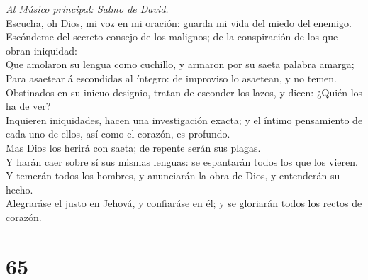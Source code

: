  \emph{Al Músico principal: Salmo de David.}\\
Escucha, oh Dios, mi voz en mi oración: guarda mi vida del miedo del
enemigo.\\
 Escóndeme del secreto consejo de los malignos; de la
conspiración de los que obran iniquidad:\\
 Que amolaron su lengua como cuchillo, y armaron por su
saeta palabra amarga;\\
 Para asaetear á escondidas al íntegro: de improviso lo
asaetean, y no temen.\\
 Obstinados en su inicuo designio, tratan de esconder los
lazos, y dicen: ¿Quién los ha de ver?\\
 Inquieren iniquidades, hacen una investigación exacta; y el
íntimo pensamiento de cada uno de ellos, así como el corazón, es
profundo.\\
 Mas Dios los herirá con saeta; de repente serán sus
plagas.\\
 Y harán caer sobre sí sus mismas lenguas: se espantarán
todos los que los vieren.\\
 Y temerán todos los hombres, y anunciarán la obra de Dios,
y entenderán su hecho.\\
 Alegraráse el justo en Jehová, y confiaráse en él; y se
gloriarán todos los rectos de corazón.

\hypertarget{section-64}{%
\section{65}\label{section-64}}

